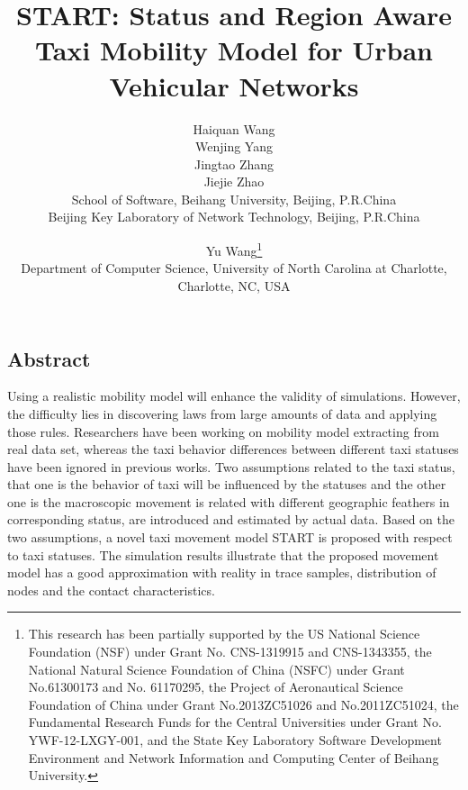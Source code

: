 \documentclass[letterpaper,twocolumn,10pt]{IEEEtran}
\begin{document}
\date{}

\title{\Large \bf START: Status and Region Aware Taxi Mobility Model for Urban Vehicular Networks}

\author{
{\rm Haiquan Wang}\\
{\rm Wenjing Yang}\\
{\rm Jingtao Zhang}\\
{\rm Jiejie Zhao}\\
School of Software, Beihang University, Beijing, P.R.China\\
Beijing Key Laboratory of Network Technology, Beijing, P.R.China\\
\and
{\rm Yu Wang\thanks{
 This research has been partially supported by the US National Science Foundation (NSF) under Grant No. CNS-1319915 and CNS-1343355, the National Natural Science Foundation of China (NSFC) under Grant No.61300173 and No. 61170295, the Project of Aeronautical Science Foundation of China under Grant No.2013ZC51026 and No.2011ZC51024, the Fundamental Research Funds for the Central Universities under Grant No. YWF-12-LXGY-001, and the State Key Laboratory Software Development Environment and Network Information and Computing Center of Beihang University.}}\\
Department of Computer Science, University of North Carolina at Charlotte, Charlotte, NC, USA\\
} %

\maketitle


\subsection*{Abstract}
Using a realistic mobility model will enhance the validity of simulations. However, the difficulty lies in discovering laws from large amounts of data and applying those rules. Researchers have been working on mobility model extracting from real data set, whereas the taxi behavior differences between different taxi statuses have been ignored in previous works.
Two assumptions related to the taxi status, that one is the behavior of taxi will be influenced by the statuses and the other one is the macroscopic movement is related with different geographic feathers in corresponding status, are introduced and estimated by actual data. Based on the two assumptions, a novel taxi movement model START is proposed with respect to taxi statuses. The simulation results illustrate that the proposed movement model has a good approximation with reality in trace samples, distribution of nodes and the contact characteristics.
\end{document}
